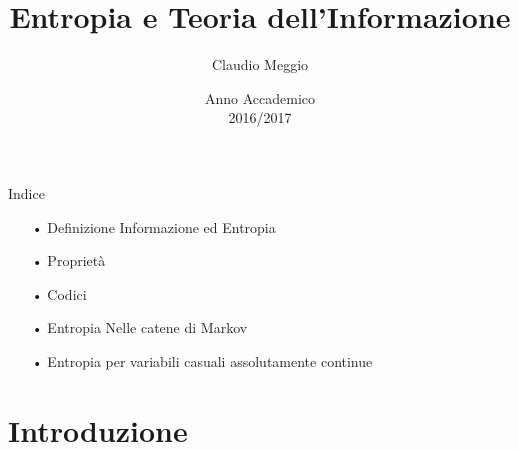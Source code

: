 \documentclass{beamer}
\theoremstyle{definition}
\numberwithin{equation}{section}
\newcommand{\spacep}{$(\Omega,\mathcal{F} ,\mathbb{P})$}
\begin{document}
\title{Entropia e Teoria dell'Informazione}
\author{Claudio Meggio}
\date{Anno Accademico\\2016/2017}



\begin{frame}
\titlepage 
\end{frame}


\begin{frame}[t]{Indice}
\vspace{40pt}
\begin{enumerate}
\item[•] Definizione Informazione ed Entropia
\item[•] Proprietà
\item[•] Codici
\item[•] Entropia Nelle catene di Markov
\item[•] Entropia per variabili casuali assolutamente continue
\end{enumerate}
\end{frame}


\section{Introduzione}


\end{document}

